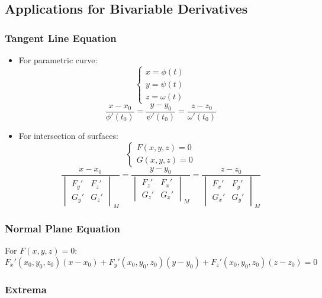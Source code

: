 \documentclass{article}
\begin{document}
\subsection{Applications for Bivariable Derivatives}

\subsubsection{Tangent Line Equation}

\begin{itemize}
    \item For parametric curve:
    \[
        \begin{cases}
            x = \phi(t) \\
            y = \psi(t) \\
            z = \omega(t)
        \end{cases}
    \]
    \[
        \frac{x - x_0}{\phi'(t_0)} = \frac{y - y_0}{\psi'(t_0)} = \frac{z - z_0}{\omega'(t_0)}
    \]

    \item For intersection of surfaces:
    \[
        \begin{cases}
            F(x, y, z) = 0 \\
            G(x, y, z) = 0
        \end{cases}
    \]
    \[
        \frac{x - x_0}{\begin{vmatrix} F_y' & F_z' \\ G_y' & G_z' \end{vmatrix}_M} = \frac{y - y_0}{\begin{vmatrix} F_z' & F_x' \\ G_z' & G_x' \end{vmatrix}_M} = \frac{z - z_0}{\begin{vmatrix} F_x' & F_y' \\ G_x' & G_y' \end{vmatrix}_M}
    \]
\end{itemize}

\subsubsection{Normal Plane Equation}

For $F(x, y, z) = 0$:
\[
    F_x'(x_0, y_0, z_0)(x - x_0) + F_y'(x_0, y_0, z_0)(y - y_0) + F_z'(x_0, y_0, z_0)(z - z_0) = 0
\]

\subsubsection{Extrema}
\end{document}
